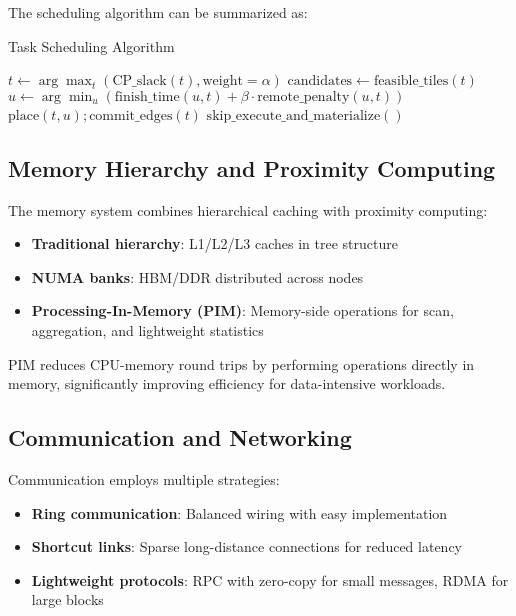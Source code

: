 \documentclass[11pt,a4paper]{article}
\begin{document}
The scheduling algorithm can be summarized as:

\begin{algorithm}
\caption{Task Scheduling Algorithm}
\begin{algorithmic}[1]
    \State $t \gets \arg\max_t(\text{CP\_slack}(t), \text{weight}=\alpha)$ 
    \State $\text{candidates} \gets \text{feasible\_tiles}(t)$ 
    \State $u \gets \arg\min_u(\text{finish\_time}(u,t) + \beta \cdot \text{remote\_penalty}(u,t))$
    \State $\text{place}(t,u); \text{commit\_edges}(t)$
        \State $\text{skip\_execute\_and\_materialize}()$
    \EndIf
\EndWhile
\end{algorithmic}
\end{algorithm}

\subsection{Memory Hierarchy and Proximity Computing}

The memory system combines hierarchical caching with proximity computing:

\begin{itemize}
\item \textbf{Traditional hierarchy}: L1/L2/L3 caches in tree structure
\item \textbf{NUMA banks}: HBM/DDR distributed across nodes
\item \textbf{Processing-In-Memory (PIM)}: Memory-side operations for scan, aggregation, and lightweight statistics
\end{itemize}

PIM reduces CPU-memory round trips by performing operations directly in memory, significantly improving efficiency for data-intensive workloads.

\subsection{Communication and Networking}

Communication employs multiple strategies:

\begin{itemize}
\item \textbf{Ring communication}: Balanced wiring with easy implementation
\item \textbf{Shortcut links}: Sparse long-distance connections for reduced latency
\item \textbf{Lightweight protocols}: RPC with zero-copy for small messages, RDMA for large blocks
\end{itemize}
\end{document}

